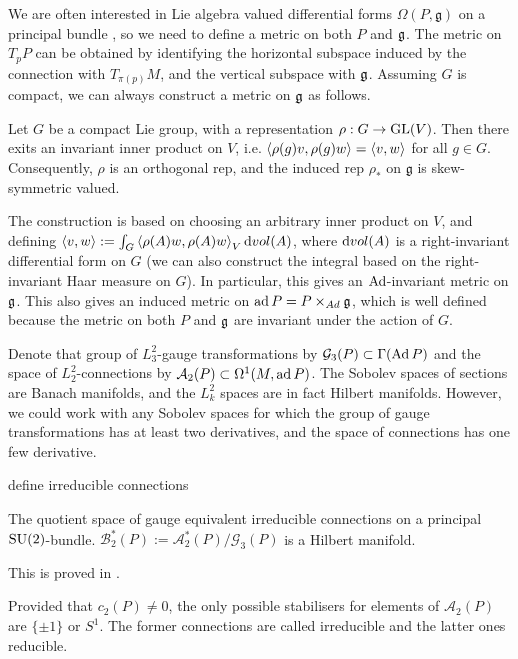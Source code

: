 We are often interested in Lie algebra valued differential forms 
$\Omega(P,\mathfrak{g})$ on a principal bundle , so we need to define a metric 
on both $P$ and $\operatorname{\mathfrak{g}}$. The metric on $T_pP$ can be obtained by identifying the 
horizontal subspace induced by the connection with  $T_{\pi(p)}M$, and the vertical
subspace with $\operatorname{\mathfrak{g}}$. Assuming $G$ is compact, we can always construct a metric on
 $\operatorname{\mathfrak{g}}$ as follows.
 \begin{thm} \label{thm:lie_inner_product}
	Let $G$ be a compact Lie group, with a representation  $\rho : G \to\operatorname{GL}(V)$.
	Then there exits an invariant inner product on  $V$, i.e. 
	$\gen{\rho(g)v,\rho(g)w} = \gen{v,w}$ for all $g\in G$. Consequently,
	$\rho$ is an orthogonal rep, and the induced rep $\rho_*$ on
	$\mathfrak{g}$ is skew-symmetric valued. 
\end{thm}
The construction is based on choosing an arbitrary inner product on $V$, and
defining $\gen{v,w} := \int_G \gen{\rho(A)w,\rho(A)w}_V \odif{vol}(A)$, where
$\odif{vol}(A)$ is a right-invariant differential form on $G$ (we can also
construct the integral based on the right-invariant Haar measure on $G$).
In particular, this gives an $\operatorname{Ad}$-invariant metric on $\operatorname{\mathfrak{g}}$. 
This also gives an induced metric on $\operatorname{ad} P = P\times_{Ad}\operatorname{\mathfrak{g}}$, which is well 
defined because the metric on both $P$ and  $\operatorname{\mathfrak{g}}$ are invariant under the action 
of  $G$. 

Denote that group of $L^2_3$-gauge transformations by  $\mathcal{G}_3(P) \subset
\Gamma(\operatorname{Ad} P)$ and the space of $L^2_2$-connections by $\mathcal{A}_2(P) \subset
\Omega^1(M,\operatorname{ad} P)$. The Sobolev spaces of sections are Banach manifolds, and 
the $L^2_k$ spaces are in fact Hilbert manifolds. However, we could work with
any Sobolev spaces for which the group of gauge transformations has at least two
derivatives, and the space of connections has one few derivative. 

define irreducible connections

\begin{thm} %
	The quotient space of gauge equivalent irreducible connections
    on a principal $\operatorname{SU}(2)$-bundle.
	$\mathcal{B}^*_2(P) := \mathcal{A}^*_2(P) / \mathcal{G}_3(P)$ is a 
	Hilbert manifold. 
\end{thm}
This is proved in \cite[Section 4.5]{morgan}. 

Provided that  $c_2(P)\neq 0$, the only possible stabilisers for elements of 
$\mathcal{A}_2(P)$ are $\{\pm 1\}$ or $S^1$. The former connections are called
irreducible and the latter ones reducible. 

